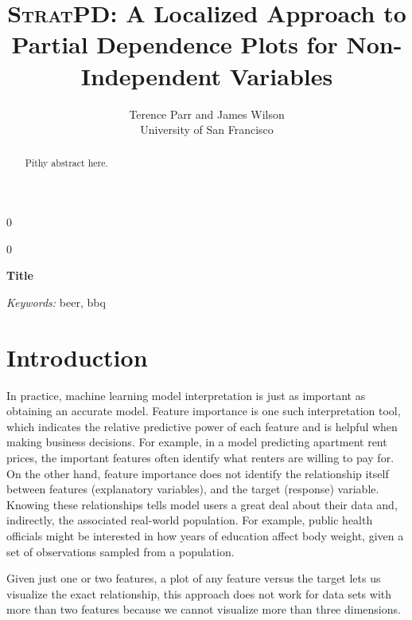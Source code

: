 \documentclass[12pt]{article}
\newcommand{\blind}{0}
\begin{document}
\def\spacingset#1{\renewcommand{\baselinestretch}%
{#1}\small\normalsize} \spacingset{1}



\blind
{
  \title{{\textsc{StratPD}}: \bf A Localized Approach to Partial Dependence Plots for Non-Independent Variables}

  \author{Terence Parr and James Wilson\\
      University of San Francisco\\
}
  \maketitle
} \fi

\blind
{
  \bigskip
  \bigskip
  \bigskip
  \begin{center}
    {\LARGE\bf Title}
\end{center}
  \medskip
} \fi

\bigskip
\begin{abstract}
Pithy abstract here.
\end{abstract}

\noindent%
{\it Keywords:} beer, bbq

\section{Introduction}
\label{sec:intro}

In practice, machine learning model interpretation is just as important as obtaining an accurate model. Feature importance is one such interpretation tool, which indicates the relative predictive power of each feature and is helpful when making business decisions. For example, in a model predicting apartment rent prices, the important features often identify what renters are willing to pay for. On the other hand, feature importance does not identify the relationship itself between features (explanatory variables),  and the target (response) variable.  Knowing these relationships tells model users a great deal about their data and, indirectly, the associated real-world population. For example, public health officials might be interested in how years of education affect body weight, given a set of observations sampled from a population.

Given just one or two features, a plot of any feature versus the target lets us visualize the exact relationship, this approach does not work for data sets with more than two features because we cannot visualize more than three dimensions.
\end{document}

